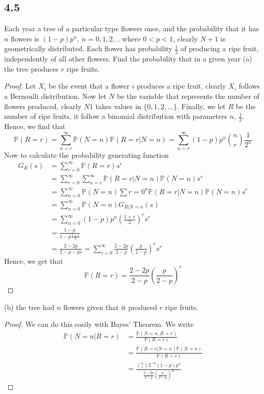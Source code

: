 \documentclass{article}
\renewcommand{\P}[1]{\mathbb{P}(#1)}
\begin{document}
\subsection*{4.5} %
Each year a tree of a particular type flowers once, and the probability that it has
$n$ flowers is $(1-p)p^n, \ n = 0,1,2,..$ where $0 < p < 1$, clearly $N + 1$ is
geometrically distributed.
Each flower has probability $\frac{1}{2}$ of producing a ripe fruit, independently
of all other flowers. Find the probability that in a given year
(a) the tree produces $r$ ripe fruits.
\begin{proof}
    Let $X_i$ be the event that a flower $i$ produces a ripe fruit, clearly $X_i$
    follows a Bernoulli distribution. Now let $N$ be the variable that represents
    the number of flowers produced, clearly $N1$ takes values in $\{0,1,2,...\}$.
    Finally, we let $R$ be the number of ripe fruits, it follow a binomial distribution
    with parameters $n, \ \frac{1}{2}$. Hence, we find that
    $$\P{R=r} = \sum_{n=r}^\infty \P{N=n}\P{R=r | N=n} = \sum_{n=r}^\infty (1-p)p^n\binom{n}{r}\frac{1}{2^n}$$
    Now to calculate the probability generating function
    \begin{align*}
        G_R(s) & = \sum_{r=0}^\infty \P{R=r}s^r                                                             \\
               & = \sum_{r=0}^\infty \sum_{n=r}^\infty \P{R=r | N=n}\P{N=n}s^r                              \\
               & = \sum_{n=0}^\infty \P{N=n} \sum{r=0}^n \P{R=r | N=n}\P{N=n}s^r                            \\
               & = \sum_{n=0}^\infty \P{N=n} G_{R|N=n}(s)                                                   \\
               & = \sum_{n=0}^\infty (1-p) p^n \left(\frac{1+s}{2}\right)^r s^r                             \\
               & = \frac{1-p}{1-p\frac{1+z}{2}}                                                             \\
               & = \frac{2-2p}{2-p-ps} = \sum_{r=0}^\infty \frac{2-2p}{2-p}\left(\frac{p}{2-p}\right)^r s^r
    \end{align*}
    Hence, we get that
    $$\P{R=r} = \frac{2-2p}{2-p}\left(\frac{p}{2-p}\right)^r$$
\end{proof}
(b) the tree had $n$ flowers given that it produced $r$ ripe fruits.
\begin{proof}
    We can do this easily with Bayes' Theorem. We write
    \begin{align*}
        \P{N=n | R = r} & = \frac{\P{N=n, R=r}}{\P{R = r}}                                                  \\
                        & = \frac{\P{R=r | N=n}\P{N=n}}{\P{R=r}}                                            \\
                        & = \frac{\binom{n}{r}2^{-n}(1-p)p^n}{\frac{2-2p}{2-p}\left(\frac{p}{2-p}\right)^n}
    \end{align*}
\end{proof}
\end{document}
